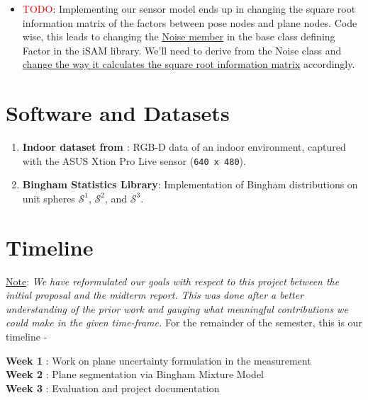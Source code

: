 \documentclass[12pt]{article}
\begin{document}
\begin{itemize}
\item \textcolor{red}{TODO}: Implementing our sensor model ends up in changing the square root information matrix of the factors between pose nodes and plane nodes. 
Code wise, this leads to changing the \href{https://github.com/madratman/planar_bmm/blob/master/isam/include/isam/Factor.h#L61}{Noise member} in the base class defining Factor in the iSAM library. 
We'll need to derive from the Noise class and \href{https://github.com/madratman/planar_bmm/blob/master/isam/include/isam/Noise.h#L60}{change the way it calculates the square root information matrix} accordingly.   

\end{itemize}

\section*{Software and Datasets}

\begin{enumerate}
\item \textbf{Indoor dataset from \cite{kaess2015simultaneous}}: RGB-D data of an indoor environment, captured with the ASUS Xtion Pro Live sensor (\texttt{640 x 480}).

\item \textbf{Bingham Statistics Library}:  Implementation of Bingham distributions on unit spheres $\mathcal{S}^1$, $\mathcal{S}^2$, and $\mathcal{S}^3$. 
\end{enumerate}

\section*{Timeline}

\underline{Note}: \textit{We have reformulated our goals with respect to this project between the initial proposal and the midterm report. This was done after a better understanding of the prior work and gauging what meaningful contributions we could make in the given time-frame.} For the remainder of the semester, this is our timeline - 

\vspace{1em}
\noindent \textbf{Week 1} : Work on plane uncertainty formulation in the measurement \\
\textbf{Week 2} : Plane segmentation via Bingham Mixture Model	\\
\textbf{Week 3} : Evaluation and project documentation 	\\

\vspace{-1em}

\small
 

\end{document}
